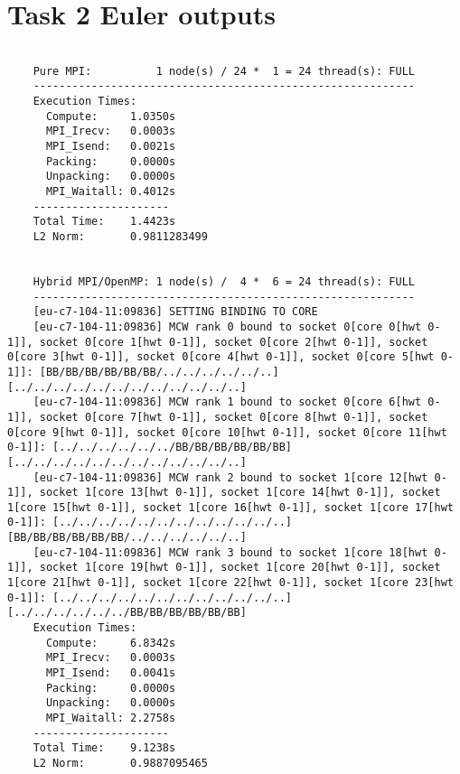\documentclass[11pt,a4paper]{article}
\begin{document}
\section{Task 2 Euler outputs}
\begin{lstlisting}[basicstyle=\tiny,
				   frame=single,
				   breaklines=true,
  	               postbreak=\mbox{\textcolor{red}{$\hookrightarrow$}\space},
                   caption={Task 2: Collected Euler outputs.}, label={lst:1}]

	Pure MPI:          1 node(s) / 24 *  1 = 24 thread(s): FULL
	-----------------------------------------------------------
	Execution Times:
	  Compute:     1.0350s
	  MPI_Irecv:   0.0003s
	  MPI_Isend:   0.0021s
	  Packing:     0.0000s
	  Unpacking:   0.0000s
	  MPI_Waitall: 0.4012s
	---------------------
	Total Time:    1.4423s
	L2 Norm:       0.9811283499
	
	
	Hybrid MPI/OpenMP: 1 node(s) /  4 *  6 = 24 thread(s): FULL 
	-----------------------------------------------------------
	[eu-c7-104-11:09836] SETTING BINDING TO CORE
	[eu-c7-104-11:09836] MCW rank 0 bound to socket 0[core 0[hwt 0-1]], socket 0[core 1[hwt 0-1]], socket 0[core 2[hwt 0-1]], socket 0[core 3[hwt 0-1]], socket 0[core 4[hwt 0-1]], socket 0[core 5[hwt 0-1]]: [BB/BB/BB/BB/BB/BB/../../../../../..][../../../../../../../../../../../..]
	[eu-c7-104-11:09836] MCW rank 1 bound to socket 0[core 6[hwt 0-1]], socket 0[core 7[hwt 0-1]], socket 0[core 8[hwt 0-1]], socket 0[core 9[hwt 0-1]], socket 0[core 10[hwt 0-1]], socket 0[core 11[hwt 0-1]]: [../../../../../../BB/BB/BB/BB/BB/BB][../../../../../../../../../../../..]
	[eu-c7-104-11:09836] MCW rank 2 bound to socket 1[core 12[hwt 0-1]], socket 1[core 13[hwt 0-1]], socket 1[core 14[hwt 0-1]], socket 1[core 15[hwt 0-1]], socket 1[core 16[hwt 0-1]], socket 1[core 17[hwt 0-1]]: [../../../../../../../../../../../..][BB/BB/BB/BB/BB/BB/../../../../../..]
	[eu-c7-104-11:09836] MCW rank 3 bound to socket 1[core 18[hwt 0-1]], socket 1[core 19[hwt 0-1]], socket 1[core 20[hwt 0-1]], socket 1[core 21[hwt 0-1]], socket 1[core 22[hwt 0-1]], socket 1[core 23[hwt 0-1]]: [../../../../../../../../../../../..][../../../../../../BB/BB/BB/BB/BB/BB]
	Execution Times:
	  Compute:     6.8342s
	  MPI_Irecv:   0.0003s
	  MPI_Isend:   0.0041s
	  Packing:     0.0000s
	  Unpacking:   0.0000s
	  MPI_Waitall: 2.2758s
	---------------------
	Total Time:    9.1238s
	L2 Norm:       0.9887095465
	

\end{lstlisting}
\end{document}
